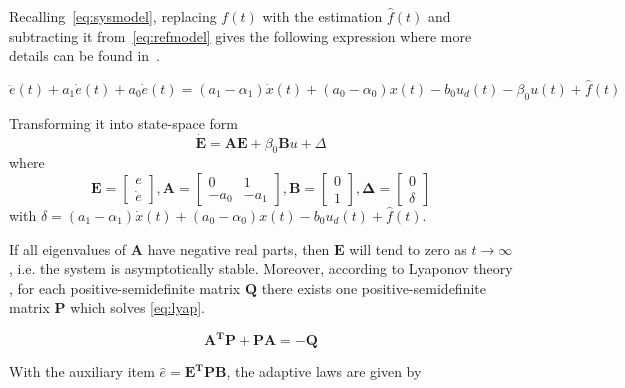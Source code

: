 Recalling~\eqref{eq:sysmodel}, replacing $f(t)$ with the estimation $\hat{f}(t)$ and subtracting it from~\eqref{eq:refmodel} gives the following expression where more details can be found in~\citep{Qingson:2016}.

\begin{equation}
  \ddot{e}(t) + a_1\dot{e}(t) + a_0\dot{e}(t) =  (a_1-\alpha_1)\dot{x}(t) + (a_0-\alpha_0)x(t) - b_0u_d(t) - \beta_0u(t) + \hat{f}(t)
\end{equation}

Transforming it into state-space form
\begin{equation}
  \label{eq:stateSpaceError}
  \mathbf{\dot{E} = AE} + \beta_0\mathbf{B}u + \Delta
\end{equation}
where
\begin{equation}
  \label{eq:matrices}
  \mathbf{E} =
    \begin{bmatrix}
       e\\[0.3em]
       \dot{e}
     \end{bmatrix},
  \mathbf{A} =
    \begin{bmatrix}
       0 & 1\\[0.3em]
       -a_0 & -a_1
     \end{bmatrix},
  \mathbf{B} =
    \begin{bmatrix}
        0\\[0.3em]
        1
    \end{bmatrix},
    \mathbf{\Delta} =
      \begin{bmatrix}
          0\\[0.3em]
          \delta
      \end{bmatrix}
\end{equation}
with $\delta = (a_1-\alpha_1)\dot{x}(t) + (a_0-\alpha_0)x(t) - b_0u_d(t) + \hat{f}(t)$.

If all eigenvalues of $\mathbf{A}$ have negative real parts, then $\mathbf{E}$ will tend to zero as  $t \to \infty$, i.e. the system is asymptotically stable. Moreover, according to Lyaponov theory \citep{Ljung:2003}, for each positive-semidefinite matrix $\mathbf{Q}$ there exists one positive-semidefinite matrix $\mathbf{P}$ which solves \eqref{eq:lyap}.

\begin{equation}
  \label{eq:lyap}
  \mathbf{A^TP + PA = -Q}
\end{equation}

With the auxiliary item $\hat{e} = \mathbf{E^TPB}$, the adaptive laws are given by

